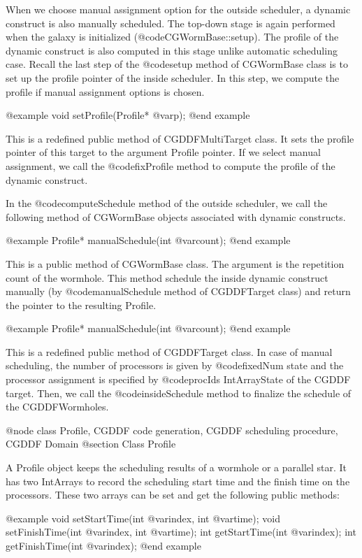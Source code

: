 {When we choose manual assignment option for the outside scheduler,
a dynamic construct is also manually scheduled. The top-down stage is
again performed when the galaxy is initialized (@code{CGWormBase::setup}).
The profile of the dynamic construct is also computed in this stage
unlike automatic scheduling case. Recall the last step of
the @code{setup} method of CGWormBase class is to set up the profile
pointer of the inside scheduler. In this step, we compute the profile
if manual assignment options is chosen.

@example
void setProfile(Profile* @var{p});
@end example

This is a redefined public method of CGDDFMultiTarget class. It sets the
profile pointer of this target to the argument Profile pointer.
If we select manual assignment, we call the @code{fixProfile} method to
compute the profile of the dynamic construct.

In the @code{computeSchedule} method of the outside scheduler, we call
the following method of CGWormBase objects associated with dynamic
constructs.

@example
Profile* manualSchedule(int @var{count});
@end example

This is a public method of CGWormBase class. The argument is the repetition
count of the wormhole. This method schedule the inside dynamic construct
manually (by @code{manualSchedule} method of CGDDFTarget class) and return
the pointer to the resulting Profile.

@example
Profile* manualSchedule(int @var{count});
@end example

This is a redefined public method of CGDDFTarget class. In case of
manual scheduling, the number of processors is given by @code{fixedNum}
state and the processor assignment is specified by @code{procIds}
IntArrayState of the CGDDF target. Then, we call the @code{insideSchedule}
method to finalize the schedule of the CGDDFWormholes.

@node class Profile, CGDDF code generation, CGDDF scheduling procedure, CGDDF Domain
@section Class Profile

A Profile object keeps the scheduling results of a wormhole or a parallel star.
It has two IntArrays to record the scheduling start time and the finish
time on the processors. These two arrays can be set and get the following
public methods:

@example
void setStartTime(int @var{index}, int @var{time});
void setFinishTime(int @var{index}, int @var{time});
int getStartTime(int @var{index});
int getFinishTime(int @var{index});
@end example

}
